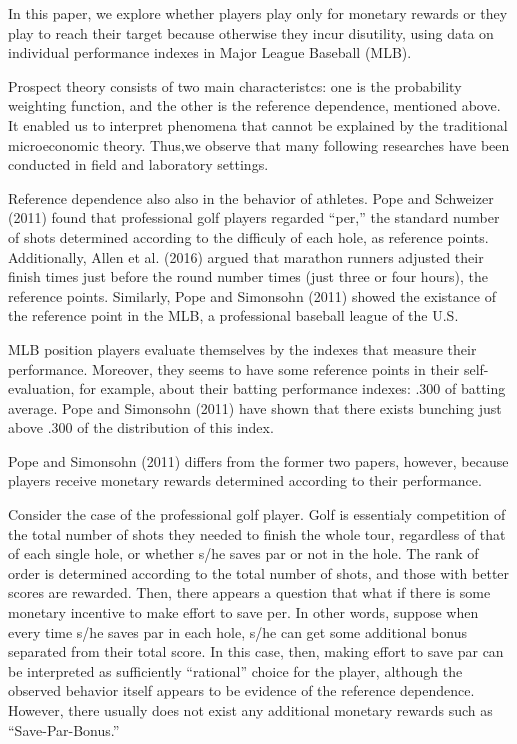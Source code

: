\documentclass[dvipdfmx, 12pt]{article}
\begin{document}
In this paper, we explore whether players play only for monetary rewards or they play to reach their target because otherwise they incur disutility, using data on individual performance indexes in Major League Baseball (MLB).

Prospect theory consists of two main characteristcs: one is the probability weighting function, and the other is the reference dependence, mentioned above. It enabled us to interpret phenomena that cannot be explained by the traditional microeconomic theory. Thus,we observe that many following researches have been conducted in field and laboratory settings.

Reference dependence also also in the behavior of athletes. Pope and Schweizer (2011) found that professional golf players regarded ``per,'' the standard number of shots determined according to the difficuly of each hole, as reference points. Additionally, Allen et al. (2016) argued that marathon runners adjusted their finish times just before the round number times (just three or four hours), the reference points. Similarly, Pope and Simonsohn (2011) showed the existance of the reference point in the MLB, a professional baseball league of the U.S.

MLB position players evaluate themselves by the indexes that measure their performance. Moreover, they seems to have some reference points in their self-evaluation, for example, about their batting performance indexes: .300 of batting average. Pope and Simonsohn (2011) have shown that there exists bunching just above .300 of the distribution of this index.

Pope and Simonsohn (2011) differs from the former two papers, however, because players receive monetary rewards determined according to their performance.

Consider the case of the professional golf player. Golf is essentialy competition of the total number of shots they needed to finish the whole tour, regardless of that of each single hole, or whether s/he saves par or not in the hole. The rank of order is determined according to the total number of shots, and those with better scores are rewarded. Then, there appears a question that what if there is some monetary incentive to make effort to save per. In other words, suppose when every time s/he saves par in each hole, s/he can get some additional bonus separated from their total score. In this case, then, making effort to save par can be interpreted as sufficiently ``rational'' choice for the player, although the observed behavior itself appears to be evidence of the reference dependence. However, there usually does not exist any additional monetary rewards such as ``Save-Par-Bonus.''
\end{document}
